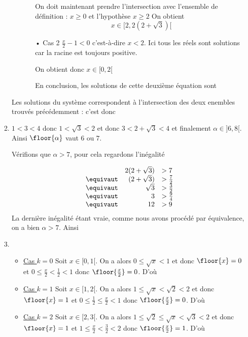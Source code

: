 \documentclass[a4paper, 11pt,reqno]{article}
\begin{document}
\begin{correction}
\begin{enumerate}
\begin{itemize}
\begin{itemize}
On doit maintenant prendre l'intersection avec l'ensemble de définition : $x\geq 0$ et l'hypothèse $x\geq 2$ 
On obtient 
$$x\in [2,2(2+\sqrt{3})[$$



\item[•] Cas 2 $\frac{x}{2}-1< 0$ c'est-à-dire $x< 2$.   Ici tous les réels sont solutions car la racine est toujours positive. 

On obtient donc $x\in [0,2[$

En conclusion, les solutions de cette deuxième équation sont 
\conclusion{  $[0,2(2+\sqrt{3})[$}

\end{itemize}
\end{itemize}

Les solutions du système correspondent à l'intersection des deux enembles trouvés précédemment : c'est donc 
\conclusion{  $[0,2(2+\sqrt{3})[$}


\item $1<3< 4$ donc $1<\sqrt{3}<2$ et donc 
$3<2+\sqrt{3}<4$ et finalement $\alpha \in ]6, 8[$.
Ainsi $\floor{\alpha  }$ vaut $6$ ou $7$. 

Vérifions que $\alpha >7$, pour cela regardons l'inégalité 

$$\begin{array}{lrl}
&2(2+\sqrt{3})&>7\\
\equivaut &(2+\sqrt{3})&>\frac{7}{2}\\
\equivaut &\sqrt{3} &>\frac{3}{2}\\
\equivaut &3&>\frac{9}{4}\\
\equivaut & 12&>9
\end{array}$$
La dernière inégalité étant vraie, comme nous avons procédé par équivalence, on a bien $\alpha >7$. 
Ainsi 

\item \begin{itemize}
\item \underline{Cas $k=0$}
Soit $x\in [0,1[$. On a alors $0\leq \sqrt{x}<1$ et donc $\floor{x}=0$ et $0\leq \frac{x}{2}<\frac{1}{2}<1$ donc 
$\floor{\frac{x}{2}} =0$. D'où 
\conclusion{
$\forall x\in [0,1[\,\quad  \floor{\sqrt{x}} = \floor{ \frac{x}{2}}$
}
\item \underline{Cas $k=1$}
Soit $x\in [1,2[$. On a alors $1\leq \sqrt{x}<\sqrt{2}<2$ et donc $\floor{x}=1$ et $0\leq \frac{1}{2}\leq \frac{x}{2}<1$ donc 
$\floor{\frac{x}{2}} =0$. D'où 
\conclusion{
$\forall x\in [1,2[\,\quad  \floor{\sqrt{x}} \neq  \floor{ \frac{x}{2}}$
}
\item \underline{Cas $k=2$}
Soit $x\in [2,3[$. On a alors $1\leq \sqrt{2}\leq\sqrt{x}<\sqrt{3}<2$ et donc $\floor{x}=1$ et $1\leq \frac{x}{2}<\frac{3}{2}<2$ donc 
$\floor{\frac{x}{2}} =1$. D'où 
\conclusion{
$\forall x\in [2,3[\,\quad  \floor{\sqrt{x}} =  \floor{ \frac{x}{2}}$
}



\end{itemize}
\end{enumerate}
\end{correction}
\end{document}
